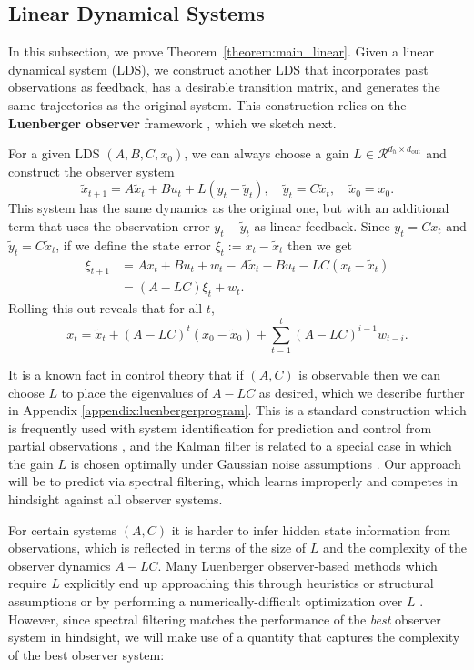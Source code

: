 \documentclass[11pt]{article}
\def\R{{\mathcal R}}
\def\R{\ensuremath{\mathcal R}}
\numberwithin{equation}{section}
\begin{document}
\subsection{Linear Dynamical Systems}

In this subsection, we prove Theorem~\ref{theorem:main_linear}. Given a linear dynamical system (LDS), we construct another LDS that incorporates past observations as feedback, has a desirable transition matrix, and generates the same trajectories as the original system. This construction relies on the \textbf{Luenberger observer} framework \cite{luenbergerobserver1971}, which we sketch next.

For a given LDS $(A, B, C, x_0)$, we can always choose a gain $L \in \R^{d_h \times d_{\textrm{out}}}$ and construct the observer system
$$\tilde{x}_{t+1} = A\tilde{x}_t + Bu_t + L(y_t - \tilde{y}_t), \quad \tilde{y}_t = C\tilde{x}_t,\quad \tilde{x}_0 = x_0.$$
This system has the same dynamics as the original one, but with an additional term that uses the observation error $y_t - \tilde{y}_t$ as linear feedback. Since $y_t = Cx_t$ and $\tilde{y}_t = C\tilde{x}_t$, if we define the state error $\xi_t := x_t - \tilde{x}_t$ then we get
\begin{align*}\xi_{t+1} &= Ax_t + Bu_t + w_t - A\tilde{x}_t - Bu_t - LC(x_t - \tilde{x}_t) \\&= (A-LC)\xi_t + w_t.\end{align*}
Rolling this out reveals that for all $t$, $$x_t = \tilde{x}_t + (A-LC)^t (x_0 - \tilde{x}_0) + \sum_{t=1}^t (A - LC)^{i-1} w_{t-i}.$$

It is a known fact in control theory that if $(A, C)$ is observable then we can choose $L$ to place the eigenvalues of $A-LC$ as desired, which we describe further in Appendix \ref{appendix:luenbergerprogram}. 
This is a standard construction which is frequently used with system identification for prediction and control from partial observations \cite{poleplacementapplication}, and the Kalman filter is related to a special case in which the gain $L$ is chosen optimally under Gaussian noise assumptions \cite{kalman1960new}. Our approach will be to predict via spectral filtering, which learns improperly and competes in hindsight against all observer systems.

For certain systems $(A, C)$ it is harder to infer hidden state information from observations, which is reflected in terms of the size of $L$ and the complexity of the observer dynamics $A - LC$. Many Luenberger observer-based methods which require $L$ explicitly end up approaching this through heuristics or structural assumptions \cite{luenbergerassumptionsA,luenbergerassumptionsB} or by performing a numerically-difficult optimization over $L$ \cite{luenbergeroptimization}. However, since spectral filtering matches the performance of the \textit{best} observer system in hindsight, we will make use of a quantity that captures the complexity of the best observer system:
\end{document}
